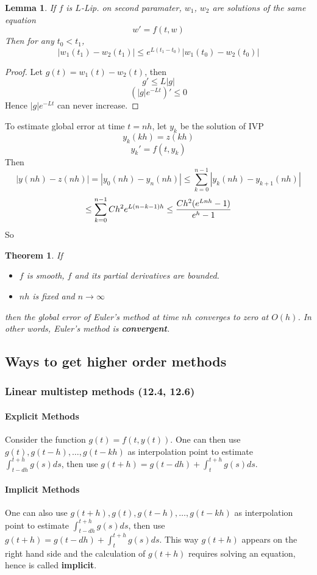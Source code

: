 \documentclass[20pt]{article} %
\theoremstyle{break}
\newtheorem{lem}[definition]{Lemma}
\newtheorem{thm}[definition]{Theorem}
\begin{document}
\newpage

\begin{lem}
If $f$ is $L$-Lip. on second paramater, $w_1$, $w_2$ are solutions of the same equation
\[w'=f(t, w)\]
Then for any $t_0<t_1$,
\[|w_1(t_1)-w_2(t_1)|\leq e^{L(t_1-t_0)}|w_1(t_0)-w_2(t_0)|\]
\end{lem}

\begin{proof}
  Let $g(t)=w_1(t)-w_2(t)$, then
  \[g'\leq L|g|\]
  \[(|g|e^{-Lt})'\leq 0\]
  Hence $|g|e^{-Lt}$ can never increase.
\end{proof}

\newpage


To estimate global error at time $t=nh$, let $y_k$ be the solution of IVP
\[y_k(kh)=z(kh)\]
\[y_k'=f(t, y_k)\]
Then
\[|y(nh)-z(nh)|=|y_0(nh)-y_n(nh)|\leq \sum_{k=0}^{n-1}|y_k(nh)-y_{k+1}(nh)|\]
\[\leq \sum_{k=0}^{n-1}Ch^2 e^{L(n-k-1)h}\leq {Ch^2(e^{Lnh}-1)\over e^h-1}\]
So
\begin{thm}
If
\begin{itemize}
\item $f$ is smooth, $f$ and its partial derivatives are bounded.
\item $nh$ is fixed and $n\rightarrow\infty$
\end{itemize}
then the global error of Euler's method at time $nh$ converges to zero at $O(h)$. In other words, Euler's method is {\bf convergent}.
\end{thm}

\newpage

\subsection{Ways to get higher order methods}

\subsubsection{Linear multistep methods (12.4, 12.6)}

\paragraph{Explicit Methods} Consider the function $g(t)=f(t, y(t))$. One can then use $g(t), g(t-h), \dots, g(t-kh)$ as interpolation point to estimate $\int_{t-dh}^{t+h}g(s)ds$, then use $g(t+h)=g(t-dh)+\int_t^{t+h}g(s)ds$.

\paragraph{Implicit Methods} One can also use $g(t+h), g(t), g(t-h), \dots, g(t-kh)$ as interpolation point to estimate $\int_{t-dh}^{t+h}g(s)ds$, then use $g(t+h)=g(t-dh)+\int_t^{t+h}g(s)ds$. This way $g(t+h)$ appears on the right hand side and the calculation of $g(t+h)$ requires solving an equation, hence is called {\bf implicit}.
\end{document}
